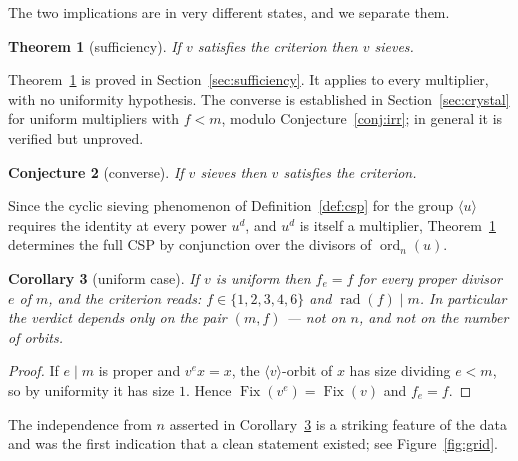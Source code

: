 \documentclass[11pt,a4paper]{article}
\theoremstyle{plain}
\newtheorem{theorem}{Theorem}[section]
\newtheorem{corollary}[theorem]{Corollary}
\newtheorem{conjecture}[theorem]{Conjecture}
\theoremstyle{definition}
\theoremstyle{remark}
\newcommand{\Fix}{\operatorname{Fix}}
\newcommand{\rad}{\operatorname{rad}}
\newcommand{\ord}{\operatorname{ord}}
\newcommand{\CSP}{\textup{CSP}}
\begin{document}
The two implications are in very different states, and we separate them.

\begin{theorem}[sufficiency]\label{thm:sufficiency}
If $v$ satisfies the criterion then $v$ sieves.
\end{theorem}

Theorem~\ref{thm:sufficiency} is proved in Section~\ref{sec:sufficiency}. It applies to
every multiplier, with no uniformity hypothesis. The converse is established in
Section~\ref{sec:crystal} for uniform multipliers with $f<m$, modulo
Conjecture~\ref{conj:irr}; in general it is verified but unproved.

\begin{conjecture}[converse]\label{conj:converse}
If $v$ sieves then $v$ satisfies the criterion.
\end{conjecture}

Since the cyclic sieving phenomenon of Definition~\ref{def:csp} for the group
$\langle u\rangle$ requires the identity at every power $u^{d}$, and $u^{d}$ is itself a
multiplier, Theorem~\ref{thm:sufficiency} determines the full \CSP{} by conjunction over the
divisors of $\ord_n(u)$.

\begin{corollary}[uniform case]\label{cor:uniform}
If $v$ is uniform then $f_e=f$ for every proper divisor $e$ of $m$, and the criterion reads:
$f\in\{1,2,3,4,6\}$ and $\rad(f)\mid m$. In particular the verdict depends only on the pair
$(m,f)$ --- not on $n$, and not on the number of orbits.
\end{corollary}

\begin{proof}
If $e\mid m$ is proper and $v^{e}x=x$, the $\langle v\rangle$-orbit of $x$ has size dividing
$e<m$, so by uniformity it has size $1$. Hence $\Fix(v^{e})=\Fix(v)$ and $f_e=f$.
\end{proof}

The independence from $n$ asserted in Corollary~\ref{cor:uniform} is a striking feature of
the data and was the first indication that a clean statement existed; see
Figure~\ref{fig:grid}.
\end{document}
